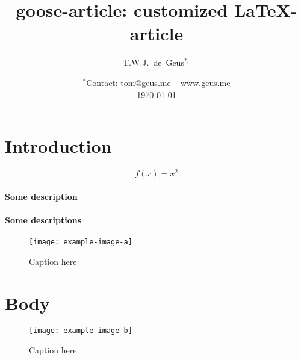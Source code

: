 \documentclass[bibpackage=biblatex, bibcols=2]{goose-article}
\title{goose-article: customized \LaTeX-article}
\author[1]{T.W.J.~de~Geus$^{*,}$}
\affil[1]{
    Physics Institute,
    \'{E}cole Polytechnique F\'{e}d\'{e}rale de Lausanne (EPFL) \nl
    Switzerland
}
\date{
    $^*$Contact:
    \href{mailto:tom@geus.me}{tom@geus.me}
    \hspace{1mm}--\hspace{1mm}
    \href{http://www.geus.me}{www.geus.me}
    \\
    \today
}
\begin{document}
\maketitle

\begin{abstract}
    \noindent
    \lipsum[1]

\end{abstract}

\section{Introduction}

\lipsum[2-4] \cite{Geus10,Geus11,Geus12,Geus13,Geus14,Geus15,Geus16,Geus17,Geus19}
\begin{equation}
    f(x) = x^2
\end{equation}

\paragraph{Some description}
\lipsum[5]

\paragraph{Some descriptions}
\lipsum[6]

\begin{figure}[htp]
    \centering
    \texttt{[image: example-image-a]}
    \caption{Caption here}
    \label{fig:a}
\end{figure}

\section{Body}

\lipsum[7-12]

\begin{figure}[htp]
    \centering
    \texttt{[image: example-image-b]}
    \caption{Caption here}
    \label{fig:b}
\end{figure}

\begin{multicols}{\bibcols}
    \printbibliography[title={References}]
\end{multicols}
\end{document}
